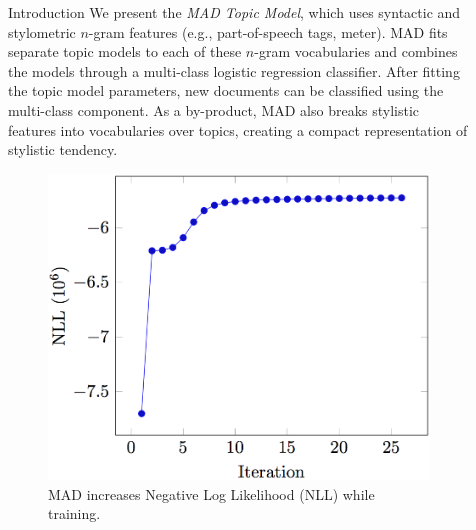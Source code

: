 \documentclass[final]{beamer}
\newlength{\sepwid}
\newlength{\onecolwid}
\newlength{\twocolwid}
\begin{document}
\begin{frame}[t]
\begin{columns}[t]
\begin{column}{\onecolwid}
\begin{block}{Introduction}
We present the \textit{MAD Topic Model}, which uses  syntactic and stylometric $n$-gram features (e.g., part-of-speech tags, meter). MAD fits separate topic models to each of these $n$-gram vocabularies and  combines the models through a multi-class logistic regression classifier. After fitting the topic model parameters, new documents can be classified using the multi-class component. As a by-product, MAD also breaks stylistic features into vocabularies over topics, creating a compact representation of stylistic tendency.

\begin{figure}
\centering
\includegraphics[width=\linewidth]{nll.png}
\caption{MAD increases Negative Log Likelihood (NLL) while training.}
\end{figure}

\end{block}




\end{column} %

\begin{column}{\sepwid}\end{column} %

\begin{column}{\twocolwid} %

\begin{columns}[t,totalwidth=\twocolwid] %


\end{columns}
\end{column}
\end{columns}
\end{frame}
\end{document}
